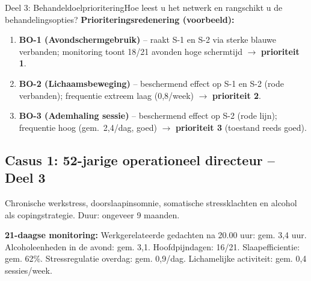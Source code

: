 \documentclass[11pt,a4paper]{article}
\begin{document}
\begin{voorbeeldbox}{Deel 3: Behandeldoelprioritering}{Hoe leest u het netwerk en rangschikt u de behandelingsopties?}
\medskip
\textbf{Prioriteringsredenering (voorbeeld):}
\begin{enumerate}[topsep=2pt,itemsep=1pt,label=\arabic*.]
\item \textbf{BO-1 (Avondschermgebruik)} -- raakt S-1 en S-2 via sterke blauwe verbanden;
monitoring toont 18/21 avonden hoge schermtijd $\rightarrow$ \textbf{prioriteit 1}.
\item \textbf{BO-2 (Lichaamsbeweging)} -- beschermend effect op S-1 en S-2 (rode verbanden);
frequentie extreem laag (0,8/week) $\rightarrow$ \textbf{prioriteit 2}.
\item \textbf{BO-3 (Ademhaling sessie)} -- beschermend effect op S-2 (rode lijn);
frequentie hoog (gem.\ 2,4/dag, goed) $\rightarrow$ \textbf{prioriteit 3} (toestand reeds goed).
\end{enumerate}
\end{voorbeeldbox}

\vspace{0.5em}

\newpage
\subsection*{Casus 1: 52-jarige operationeel directeur -- Deel 3}

\begin{complaintbox}[title={Casus 1: 52-jarige operationeel directeur}]
\small Chronische werkstress, doorslaapinsomnie, somatische stressklachten en alcohol als copingstrategie. Duur: ongeveer 9 maanden.
\end{complaintbox}

\begin{monitorbox}
\small\textbf{21-daagse monitoring:} Werkgerelateerde gedachten na 20.00 uur: gem. 3,4 uur. Alcoholeenheden in de avond: gem. 3,1. Hoofdpijndagen: 16/21. Slaapefficientie: gem. 62\%. Stressregulatie overdag: gem. 0,9/dag. Lichamelijke activiteit: gem. 0,4 sessies/week.
\end{monitorbox}
\end{document}
